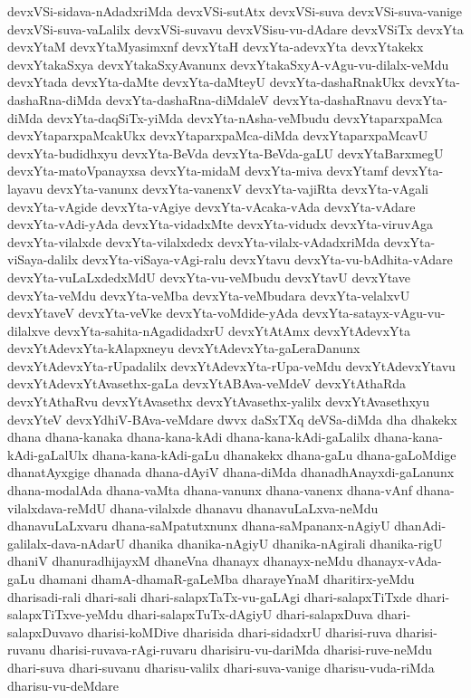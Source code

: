 {devxVSi-sidava-nAdadxriMda
devxVSi-sutAtx
devxVSi-suva
devxVSi-suva-vanige
devxVSi-suva-vaLalilx
devxVSi-suvavu
devxVSisu-vu-dAdare
devxVSiTx
devxYta
devxYtaM
devxYtaMyasimxnf
devxYtaH
devxYta-adevxYta
devxYtakekx
devxYtakaSxya
devxYtakaSxyAvanunx
devxYtakaSxyA-vAgu-vu-dilalx-veMdu
devxYtada
devxYta-daMte
devxYta-daMteyU
devxYta-dashaRnakUkx
devxYta-dashaRna-diMda
devxYta-dashaRna-diMdaleV
devxYta-dashaRnavu
devxYta-diMda
devxYta-daqSiTx-yiMda
devxYta-nAsha-veMbudu
devxYtaparxpaMca
devxYtaparxpaMcakUkx
devxYtaparxpaMca-diMda
devxYtaparxpaMcavU
devxYta-budidhxyu
devxYta-BeVda
devxYta-BeVda-gaLU
devxYtaBarxmegU
devxYta-matoVpanayxsa
devxYta-midaM
devxYta-miva
devxYtamf
devxYta-layavu
devxYta-vanunx
devxYta-vanenxV
devxYta-vajiRta
devxYta-vAgali
devxYta-vAgide
devxYta-vAgiye
devxYta-vAcaka-vAda
devxYta-vAdare
devxYta-vAdi-yAda
devxYta-vidadxMte
devxYta-vidudx
devxYta-viruvAga
devxYta-vilalxde
devxYta-vilalxdedx
devxYta-vilalx-vAdadxriMda
devxYta-viSaya-dalilx
devxYta-viSaya-vAgi-ralu
devxYtavu
devxYta-vu-bAdhita-vAdare
devxYta-vuLaLxdedxMdU
devxYta-vu-veMbudu
devxYtavU
devxYtave
devxYta-veMdu
devxYta-veMba
devxYta-veMbudara
devxYta-velalxvU
devxYtaveV
devxYta-veVke
devxYta-voMdide-yAda
devxYta-satayx-vAgu-vu-dilalxve
devxYta-sahita-nAgadidadxrU
devxYtAtAmx
devxYtAdevxYta
devxYtAdevxYta-kAlapxneyu
devxYtAdevxYta-gaLeraDanunx
devxYtAdevxYta-rUpadalilx
devxYtAdevxYta-rUpa-veMdu
devxYtAdevxYtavu
devxYtAdevxYtAvasethx-gaLa
devxYtABAva-veMdeV
devxYtAthaRda
devxYtAthaRvu
devxYtAvasethx
devxYtAvasethx-yalilx
devxYtAvasethxyu
devxYteV
devxYdhiV-BAva-veMdare
dwvx
daSxTXq
deVSa-diMda
dha
dhakekx
dhana
dhana-kanaka
dhana-kana-kAdi
dhana-kana-kAdi-gaLalilx
dhana-kana-kAdi-gaLalUlx
dhana-kana-kAdi-gaLu
dhanakekx
dhana-gaLu
dhana-gaLoMdige
dhanatAyxgige
dhanada
dhana-dAyiV
dhana-diMda
dhanadhAnayxdi-gaLanunx
dhana-modalAda
dhana-vaMta
dhana-vanunx
dhana-vanenx
dhana-vAnf
dhana-vilalxdava-reMdU
dhana-vilalxde
dhanavu
dhanavuLaLxva-neMdu
dhanavuLaLxvaru
dhana-saMpatutxnunx
dhana-saMpananx-nAgiyU
dhanAdi-galilalx-dava-nAdarU
dhanika
dhanika-nAgiyU
dhanika-nAgirali
dhanika-rigU
dhaniV
dhanuradhijayxM
dhaneVna
dhanayx
dhanayx-neMdu
dhanayx-vAda-gaLu
dhamani
dhamA-dhamaR-gaLeMba
dharayeYnaM
dharitirx-yeMdu
dharisadi-rali
dhari-sali
dhari-salapxTaTx-vu-gaLAgi
dhari-salapxTiTxde
dhari-salapxTiTxve-yeMdu
dhari-salapxTuTx-dAgiyU
dhari-salapxDuva
dhari-salapxDuvavo
dharisi-koMDive
dharisida
dhari-sidadxrU
dharisi-ruva
dharisi-ruvanu
dharisi-ruvava-rAgi-ruvaru
dharisiru-vu-dariMda
dharisi-ruve-neMdu
dhari-suva
dhari-suvanu
dharisu-valilx
dhari-suva-vanige
dharisu-vuda-riMda
dharisu-vu-deMdare
}

